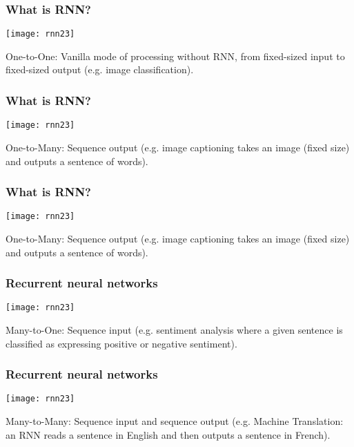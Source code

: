 \begin{frame}[fragile] \frametitle{What is RNN?}

\begin{center}
\texttt{[image: rnn23]}
\end{center}
One-to-One: Vanilla mode of processing without RNN, from fixed-sized input to fixed-sized output (e.g. image classification).
\end{frame}

\begin{frame}[fragile] \frametitle{What is RNN?}

\begin{center}
\texttt{[image: rnn23]}
\end{center}
One-to-Many: Sequence output (e.g. image captioning takes an image (fixed size) and outputs a sentence of words).
\end{frame}

\begin{frame}[fragile] \frametitle{What is RNN?}

\begin{center}
\texttt{[image: rnn23]}
\end{center}
One-to-Many: Sequence output (e.g. image captioning takes an image (fixed size) and outputs a sentence of words).
\end{frame}

\begin{frame}[fragile] \frametitle{Recurrent neural networks}
\begin{center}
\texttt{[image: rnn23]}
\end{center}
Many-to-One: Sequence input (e.g. sentiment analysis where a given sentence is classified as expressing positive or negative sentiment).
\end{frame}

\begin{frame}[fragile] \frametitle{Recurrent neural networks}
\begin{center}
\texttt{[image: rnn23]}
\end{center}
Many-to-Many: Sequence input and sequence output (e.g. Machine Translation: an RNN reads a sentence in English and then outputs a sentence in French).
\end{frame}

